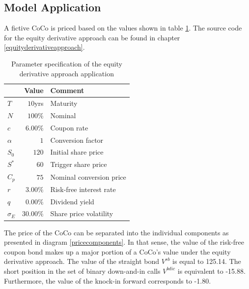 \subsection{Model Application}
A fictive CoCo is priced based on the values shown in table \ref{equityexample}. The source code for the equity derivative approach can be found in chapter \ref{equityderivativeapproach}. 
\begin{table}[H]
	\setlength{\extrarowheight}{2.5pt}
	\centering
	\begin{tabular}{lrl}
		\toprule
			 & \textbf{Value} & \textbf{Comment} \\
		\midrule
			$T$ & $10$yrs & Maturity \\
			$N$ & $100\%$ & Nominal \\			
			$c$ & $6.00\%$ & Coupon rate \\
			$\alpha$ & $1$ & Conversion factor \\ 
			$S_0$ & $120$ & Initial share price \\
			$S^*$ & $60$ & Trigger share price \\
			$C_p$ & $75$ & Nominal conversion price \\
			$r$ & $3.00\%$ & Risk-free interest rate\\
			$q$ & $0.00\%$ & Dividend yield \\
			$\sigma_E$& $30.00\%$ & Share price volatility \\
		\bottomrule
	\end{tabular}
	\caption[Parameter specification of equity derivative approach application]{Parameter specification of the equity derivative approach application}
	\label{equityexample}
\end{table}
The price of the CoCo can be separated into the individual components as presented in diagram \ref{pricecomponents}. In that sense, the value of the risk-free coupon bond makes up a major portion of a CoCo's value under the equity derivative approach. The value of the straight bond $V^{sb}$ is equal to 125.14. The short position in the set of binary down-and-in calls $V^{bdic}$ is equivalent to -15.88. Furthermore, the value of the knock-in forward corresponds to -1.80.

